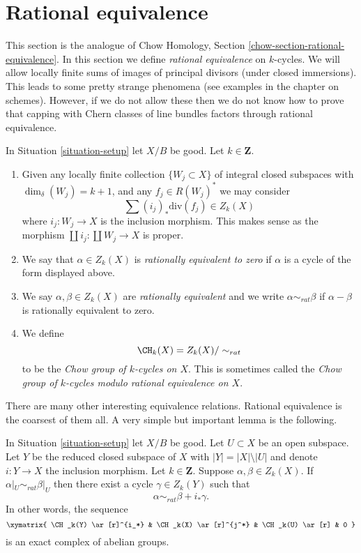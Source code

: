 \section{Rational equivalence}
\label{section-rational-equivalence}

\noindent
This section is the analogue of
Chow Homology, Section \ref{chow-section-rational-equivalence}.
In this section we define {\it rational equivalence} on $k$-cycles.
We will allow locally finite sums of images of
principal divisors (under closed immersions). This leads to some
pretty strange phenomena (see examples in the chapter on schemes).
However, if we do not allow these then we do not know how to prove that
capping with Chern classes of line bundles factors through rational
equivalence.

\begin{definition}
\label{definition-rational-equivalence}
In Situation \ref{situation-setup} let $X/B$ be good.
Let $k \in \mathbf{Z}$.
\begin{enumerate}
\item Given any locally finite collection $\{W_j \subset X\}$
of integral closed subspaces with $\dim_\delta(W_j) = k + 1$,
and any $f_j \in R(W_j)^*$ we may consider
$$
\sum (i_j)_*\text{div}(f_j) \in Z_k(X)
$$
where $i_j : W_j \to X$ is the inclusion morphism.
This makes sense as the morphism
$\coprod i_j : \coprod W_j \to X$ is proper.
\item We say that $\alpha \in Z_k(X)$ is {\it rationally equivalent to zero}
if $\alpha$ is a cycle of the form displayed above.
\item We say $\alpha, \beta \in Z_k(X)$ are
{\it rationally equivalent} and we write $\alpha \sim_{rat} \beta$
if $\alpha - \beta$ is rationally equivalent to zero.
\item We define
$$
\CH_k(X) = Z_k(X) / \sim_{rat}
$$
to be the {\it Chow group of $k$-cycles on $X$}. This is sometimes called
the {\it Chow group of $k$-cycles modulo rational equivalence on $X$}.
\end{enumerate}
\end{definition}

\noindent
There are many other interesting equivalence relations.
Rational equivalence is the coarsest of them all.
A very simple but important lemma is the following.

\begin{lemma}
\label{lemma-restrict-to-open}
In Situation \ref{situation-setup} let $X/B$ be good.
Let $U \subset X$ be an open subspace. Let $Y$ be the
reduced closed subspace of $X$ with $|Y| = |X| \setminus |U|$
and denote $i : Y \to X$ the inclusion morphism. Let $k \in \mathbf{Z}$.
Suppose $\alpha, \beta \in Z_k(X)$. If $\alpha|_U \sim_{rat} \beta|_U$
then there exist a cycle $\gamma \in Z_k(Y)$ such that
$$
\alpha \sim_{rat} \beta + i_*\gamma.
$$
In other words, the sequence
$$
\xymatrix{
\CH_k(Y) \ar[r]^{i_*} & \CH_k(X) \ar[r]^{j^*} & \CH_k(U) \ar[r] & 0
}
$$
is an exact complex of abelian groups.
\end{lemma}

